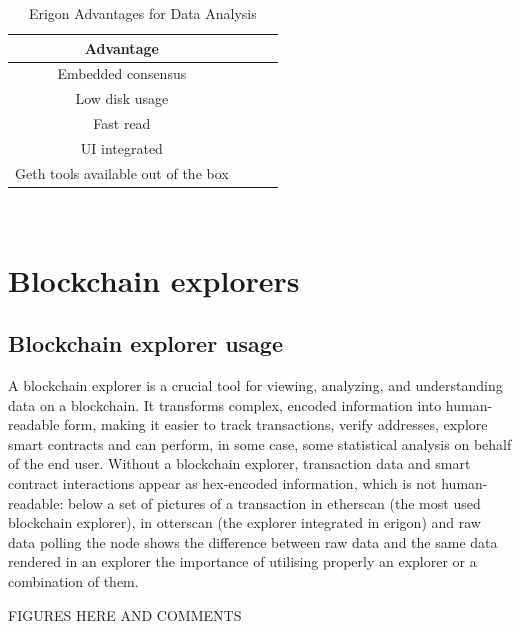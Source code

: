 \documentclass[11pt,a4paper,titlepage]{scrartcl}
\begin{document}
\begin{table}[ht]
\centering
\caption{Erigon Advantages for Data Analysis}
\begin{tabular}{cccc} \hline\hline
\textbf{Advantage} \\ \midrule
Embedded consensus \\
Low disk usage \\
Fast read \\
UI integrated \\
Geth tools available out of the box \\ \bottomrule
\end{tabular}\\
\label{tab:adverigon}
\end{table}

\section{Blockchain explorers}
\subsection{Blockchain explorer usage}
A blockchain explorer is a crucial tool for viewing, analyzing, and understanding data on a blockchain. It transforms complex, encoded information into human-readable form, making it easier to track transactions, verify addresses, explore smart contracts and can perform, in some case, some statistical analysis on behalf of the end user. Without a blockchain explorer, transaction data and smart contract interactions appear as hex-encoded information, which is not human-readable: below a set of pictures of a transaction in etherscan (the most used blockchain explorer), in otterscan (the explorer integrated in erigon) and raw data polling the node shows the difference between raw data and the same data rendered in an explorer  the importance of utilising properly an explorer or a combination of them.


FIGURES HERE AND COMMENTS
\end{document}
